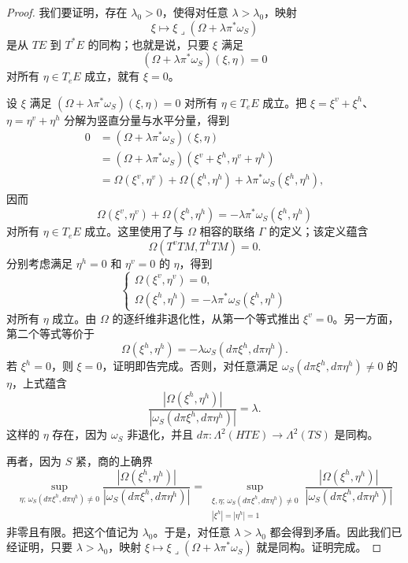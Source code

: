 \begin{proof}
我们要证明，存在 $\lambda_0>0$，使得对任意 $\lambda>\lambda_0$，映射
\[
 \xi\longmapsto \xi\mathbin\lrcorner
 (\Omega+\lambda\pi^*\omega_S)
\]
是从 $TE$ 到 $T^*E$ 的同构；也就是说，只要 $\xi$ 满足
\[
 (\Omega+\lambda\pi^*\omega_S)(\xi,\eta)=0
\]
对所有 $\eta\in T_eE$ 成立，就有 $\xi=0$。

设 $\xi$ 满足
$(\Omega+\lambda\pi^*\omega_S)(\xi,\eta)=0$ 对所有
$\eta\in T_eE$ 成立。把
$\xi=\xi^v+\xi^h$、$\eta=\eta^v+\eta^h$ 分解为竖直分量与水平分量，得到
\[
\begin{aligned}
 0&=(\Omega+\lambda\pi^*\omega_S)(\xi,\eta)\\
  &=(\Omega+\lambda\pi^*\omega_S)
    (\xi^v+\xi^h,\eta^v+\eta^h)\\
  &=\Omega(\xi^v,\eta^v)+\Omega(\xi^h,\eta^h)
    +\lambda\pi^*\omega_S(\xi^h,\eta^h),
\end{aligned}
\]
因而
\[
 \Omega(\xi^v,\eta^v)+\Omega(\xi^h,\eta^h)
 =-\lambda\pi^*\omega_S(\xi^h,\eta^h)
\]
对所有 $\eta\in T_eE$ 成立。这里使用了与 $\Omega$ 相容的联络
$\Gamma$ 的定义；该定义蕴含
\[
 \Omega(T^vTM,T^hTM)=0.
\]
分别考虑满足 $\eta^h=0$ 和 $\eta^v=0$ 的 $\eta$，得到
\[
 \begin{cases}
  \Omega(\xi^v,\eta^v)=0,\\
  \Omega(\xi^h,\eta^h)=-\lambda\pi^*\omega_S(\xi^h,\eta^h)
 \end{cases}
\]
对所有 $\eta$ 成立。由 $\Omega$ 的逐纤维非退化性，从第一个等式推出
$\xi^v=0$。另一方面，第二个等式等价于
\[
 \Omega(\xi^h,\eta^h)
 =-\lambda\omega_S(d\pi\xi^h,d\pi\eta^h).
\]
若 $\xi^h=0$，则 $\xi=0$，证明即告完成。否则，对任意满足
$\omega_S(d\pi\xi^h,d\pi\eta^h)\ne0$ 的 $\eta$，上式蕴含
\[
 \frac{|\Omega(\xi^h,\eta^h)|}
 {|\omega_S(d\pi\xi^h,d\pi\eta^h)|}=\lambda.
\]
这样的 $\eta$ 存在，因为 $\omega_S$ 非退化，并且
$d\pi:\Lambda^2(HTE)\to\Lambda^2(TS)$ 是同构。

再者，因为 $S$ 紧，商的上确界
\[
 \sup_{\eta;\,\omega_S(d\pi\xi^h,d\pi\eta^h)\ne0}
 \frac{|\Omega(\xi^h,\eta^h)|}
 {|\omega_S(d\pi\xi^h,d\pi\eta^h)|}
 =
 \sup_{\substack{\xi,\eta;\,
   \omega_S(d\pi\xi^h,d\pi\eta^h)\ne0\\
   |\xi^h|=|\eta^h|=1}}
 \frac{|\Omega(\xi^h,\eta^h)|}
 {|\omega_S(d\pi\xi^h,d\pi\eta^h)|}
\]
非零且有限。把这个值记为 $\lambda_0$。于是，对任意
$\lambda>\lambda_0$ 都会得到矛盾。因此我们已经证明，只要
$\lambda>\lambda_0$，映射
$\xi\mapsto\xi\mathbin\lrcorner(\Omega+\lambda\pi^*\omega_S)$
就是同构。证明完成。
\end{proof}

